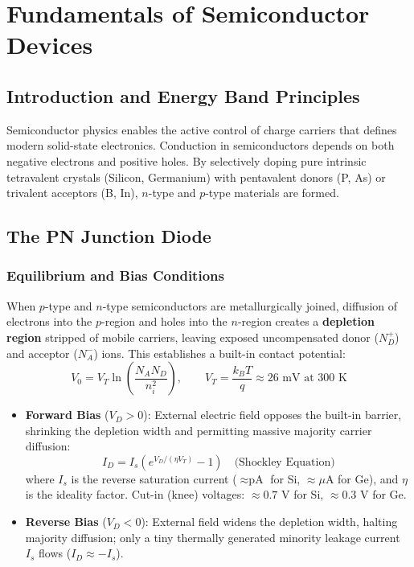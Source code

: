 \chapter{Fundamentals of Semiconductor Devices}
\label{chap:semiconductors}

\section{Introduction and Energy Band Principles}
Semiconductor physics enables the active control of charge carriers that defines modern solid-state electronics. Conduction in semiconductors depends on both negative electrons and positive holes. By selectively doping pure intrinsic tetravalent crystals (Silicon, Germanium) with pentavalent donors (P, As) or trivalent acceptors (B, In), $n$-type and $p$-type materials are formed.

\section{The PN Junction Diode}

\subsection{Equilibrium and Bias Conditions}
When $p$-type and $n$-type semiconductors are metallurgically joined, diffusion of electrons into the $p$-region and holes into the $n$-region creates a \textbf{depletion region} stripped of mobile carriers, leaving exposed uncompensated donor ($N_D^+$) and acceptor ($N_A^-$) ions. This establishes a built-in contact potential:
\begin{equation}
V_0 = V_T \ln\left( \frac{N_A N_D}{n_i^2} \right), \qquad V_T = \frac{k_B T}{q} \approx 26\text{ mV at } 300\text{ K}
\end{equation}
\begin{itemize}[leftmargin=1.5em]
    \item \textbf{Forward Bias} ($V_D > 0$): External electric field opposes the built-in barrier, shrinking the depletion width and permitting massive majority carrier diffusion:
    \begin{equation}
    I_D = I_s \left( e^{V_D / (\eta V_T)} - 1 \right) \quad \text{(Shockley Equation)}
    \end{equation}
    where $I_s$ is the reverse saturation current ($\approx \text{pA}$ for Si, $\approx \mu\text{A}$ for Ge), and $\eta$ is the ideality factor. Cut-in (knee) voltages: $\approx 0.7\text{ V}$ for Si, $\approx 0.3\text{ V}$ for Ge.
    \item \textbf{Reverse Bias} ($V_D < 0$): External field widens the depletion width, halting majority diffusion; only a tiny thermally generated minority leakage current $I_s$ flows ($I_D \approx -I_s$).
\end{itemize}

